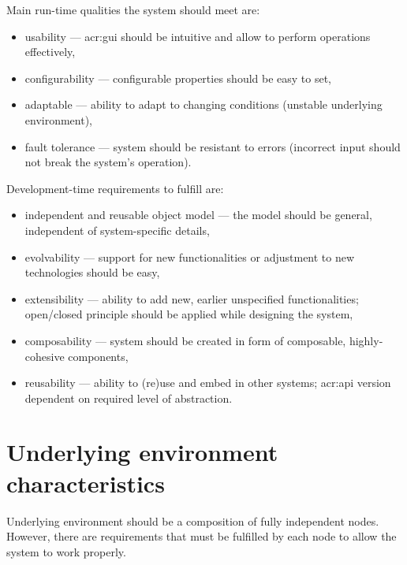 \documentclass[11pt,openany]{book}
\begin{document}
      Main run-time qualities the system should meet are:

      \begin{itemize}
        \item usability --- \gls{acr:gui} should be intuitive and allow to perform operations effectively,
        \item configurability --- configurable properties should be easy to set,
        \item adaptable --- ability to adapt to changing conditions (unstable underlying environment),
        \item fault tolerance --- system should be resistant to errors (incorrect input should not break the system's
                                  operation).
      \end{itemize}

      Development-time requirements to fulfill are:

      \begin{itemize}
        \item independent and reusable object model --- the model should be general, independent of system-specific
                                                        details,
        \item evolvability --- support for new functionalities or adjustment to new technologies should be easy,
        \item extensibility --- ability to add new, earlier unspecified functionalities; open/closed principle should be
                                applied while designing the system,
        \item composability --- system should be created in form of composable, highly-cohesive components,
        \item reusability --- ability to (re)use and embed in other systems; \gls{acr:api} version dependent on required
                              level of abstraction.
      \end{itemize}


    \section{Underlying environment characteristics}
    \label{sec:req:env}

      Underlying environment should be a composition of fully independent nodes. However, there are requirements that
      must be fulfilled by each node to allow the system to work properly.
\end{document}
